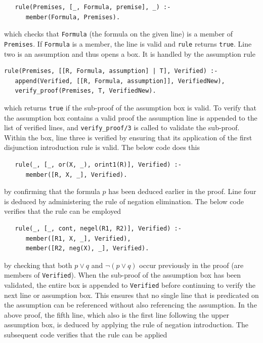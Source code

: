 \documentclass[a4paper, 11pt]{article}
\begin{document}
\begin{enumerate}
\begin{verbatim}
   rule(Premises, [_, Formula, premise], _) :-
      member(Formula, Premises).
\end{verbatim}
                    
            which checks that \texttt{Formula} (the formula
            on the given line) is a member of
            \texttt{Premises}. If \texttt{Formula} is a
            member, the line is valid and \texttt{rule} returns
            \texttt{true}. Line two is an assumption and thus 
            opens a box. It is handled by the assumption rule

\begin{verbatim}
rule(Premises, [[R, Formula, assumption] | T], Verified) :-
   append(Verified, [[R, Formula, assumption]], VerifiedNew),
   verify_proof(Premises, T, VerifiedNew).
\end{verbatim}

            which returns \texttt{true} if the sub-proof of the
            assumption box is valid. To verify that the
            assumption box contains a valid proof the
            assumption line is appended to the list of
            verified lines, and \texttt{verify\_proof/3} is
            called to validate the sub-proof. Within the box,
            line three is verified by ensuring that its
            application of the first disjunction introduction
            rule is valid. The below code does this

\begin{verbatim}
   rule(_, [_, or(X, _), orint1(R)], Verified) :-
      member([R, X, _], Verified).
\end{verbatim}

            by confirming that the formula $p$ has been
            deduced earlier in the proof. Line four is deduced
            by administering the rule of negation elimination.
            The below code verifies that the rule can be
            employed

\begin{verbatim}
   rule(_, [_, cont, negel(R1, R2)], Verified) :-
      member([R1, X, _], Verified),
      member([R2, neg(X), _], Verified).
\end{verbatim}

            by checking that both $p \vee q$ and 
            $\neg(p \vee q)$ occur previously in the proof
            (are members of \texttt{Verified}). When the
            sub-proof of the assumption box has been
            validated, the entire box is appended to
            \texttt{Verified} before continuing to verify the
            next line or assumption box. This ensures that no
            single line that is predicated on the assumption
            can be referenced without also referencing the
            assumption. In the above proof, the fifth line, 
            which also is the first line following the
            upper assumption box, is deduced by applying the
            rule of negation introduction. The subsequent code
            verifies that the rule can be applied


\end{enumerate}
\end{document}
